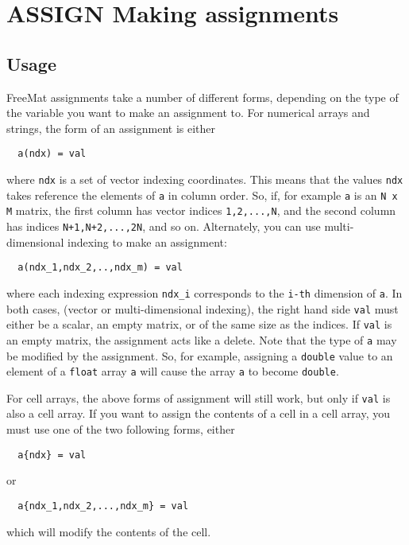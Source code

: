 \section{ASSIGN Making assignments}

\subsection{Usage}

FreeMat assignments take a number of different forms, depending 
on the type of the variable you want to make an assignment to.
For numerical arrays and strings, the form of an assignment
is either
\begin{verbatim}
  a(ndx) = val
\end{verbatim}
where \verb|ndx| is a set of vector indexing coordinates.  This means
that the values \verb|ndx| takes reference the elements of \verb|a| in column
order.  So, if, for example \verb|a| is an \verb|N x M| matrix, the first column
has vector indices \verb|1,2,...,N|, and the second column has indices
\verb|N+1,N+2,...,2N|, and so on.  Alternately, you can use multi-dimensional
indexing to make an assignment:
\begin{verbatim}
  a(ndx_1,ndx_2,..,ndx_m) = val
\end{verbatim}
where each indexing expression \verb|ndx_i| corresponds to the \verb|i-th| dimension
of \verb|a|.  In both cases, (vector or multi-dimensional indexing), the
right hand side \verb|val| must either be a scalar, an empty matrix, or of the
same size as the indices.  If \verb|val| is an empty matrix, the assignment acts
like a delete.  Note that the type of \verb|a| may be modified by the assignment.
So, for example, assigning a \verb|double| value to an element of a \verb|float| 
array \verb|a| will cause the array \verb|a| to become \verb|double|.  

For cell arrays, the above forms of assignment will still work, but only
if \verb|val| is also a cell array.  If you want to assign the contents of
a cell in a cell array, you must use one of the two following forms, either
\begin{verbatim}
  a{ndx} = val
\end{verbatim}
or
\begin{verbatim}
  a{ndx_1,ndx_2,...,ndx_m} = val
\end{verbatim}
which will modify the contents of the cell.
